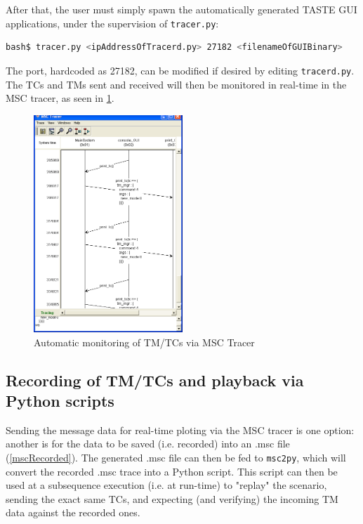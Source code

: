 \documentclass[11pt]{book}
\begin{document}
After that, the user must simply spawn the automatically generated TASTE GUI applications, under the supervision of \texttt{tracer.py}:

      \begin{lstlisting}[language=bash]
bash$ tracer.py <ipAddressOfTracerd.py> 27182 <filenameOfGUIBinary>
      \end{lstlisting}

The port, hardcoded as 27182, can be modified if desired by editing \texttt{tracerd.py}. The TCs and TMs sent and received will then
be monitored in real-time in the MSC tracer, as seen in \ref{mscRepeated}.

\begin{figure}
\centering
\includegraphics[width=0.5\textwidth]{imgs/msc}
\caption{Automatic monitoring of TM/TCs via MSC Tracer}
\label{mscRepeated}
\end{figure}

\subsection{Recording of TM/TCs and playback via Python scripts}

Sending the message data for real-time ploting via the MSC tracer is one option: another is for the data to be saved (i.e. recorded) into an .msc file (\ref{mscRecorded}). The generated .msc file can then be fed to {\tt msc2py}, which will convert the recorded .msc trace into a Python script. This script can then be used at a subsequence execution (i.e. at run-time) to "replay" the scenario, sending the exact same TCs, and expecting (and verifying) the incoming TM data against the recorded ones.
\end{document}
